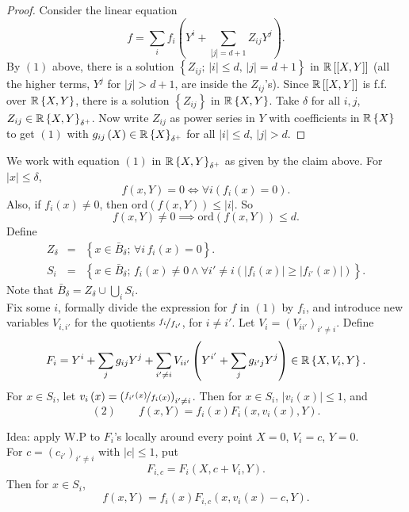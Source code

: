 \begin{proof}
Consider the linear equation 
\[
f=\sum_{i}f_{i}\left(Y^{i}+\sum_{\left|j\right|=d+1}Z_{ij}Y^{j}\right).
\]
By $\left(1\right)$ above, there is a solution $\left\{ Z_{ij};\,\left|i\right|\leq d,\,\left|j\right|=d+1\right\} $
in $\mathbb{R}\left[\left[X,Y\right]\right]$ (all the higher terms, $Y^{j}$
for $\left|j\right|>d+1$, are inside the $Z_{ij}$'s). Since $\mathbb{R}\left[\left[X,Y\right]\right]$
is f.f. over $\mathbb{R}\left\{ X,Y\right\} $, there is a solution $\left\{ Z_{ij}\right\} $
in $\mathbb{R}\left\{ X,Y\right\} $. Take $\delta$ for all $i,j$, $Z_{ij}\in\mathbb{R}\left\{ X,Y\right\} _{\delta^{+}}$.
Now write $Z_{ij}$ as power series in $Y$ with coefficients in $\mathbb{R}\left\{ X\right\} $
to get $\left(1\right)$ with $g_{ij}\left(X\right)\in\mathbb{R}\left\{ X\right\} _{\delta^{+}}$
for all $\left|i\right|\leq d$, $\left|j\right|>d$.
\end{proof}
We work with equation $\left(1\right)$ in $\mathbb{R}\left\{ X,Y\right\} _{\delta^{+}}$
as given by the claim above. For $\left|x\right|\leq\delta$,
\[
f\left(x,Y\right)=0\iff\forall i\left(f_{i}\left(x\right)=0\right).
\]
Also, if $f_{i}\left(x\right)\neq0$, then $\mathrm{ord}\left(f\left(x,Y\right)\right)\leq\left|i\right|$.
So
\[
f\left(x,Y\right)\neq0\implies\mathrm{ord}\left(f\left(x,Y\right)\right)\leq d.
\]
Define 
\begin{eqnarray*}
Z_{\delta} & = & \left\{ x\in\bar{B}_{\delta};\,\forall i\, f_{i}\left(x\right)=0\right\} .\\
S_{i} & = & \left\{ x\in\bar{B}_{\delta};\, f_{i}\left(x\right)\neq0\wedge\forall i'\neq i\left(\left|f_{i}\left(x\right)\right|\geq\left|f_{i'}\left(x\right)\right|\right)\right\} .
\end{eqnarray*}
Note that $\bar{B}_{\delta}=Z_{\delta}\cup\bigcup_{i}S_{i}$.\\
Fix some $i$, formally divide the expression for $f$ in $\left(1\right)$
by $f_{i}$, and introduce new variables $V_{i,i'}$ for the quotients
$\nicefrac{f_{i}}{f_{i'}}$, for $i\neq i'$. Let $V_{i}=\left(V_{ii'}\right)_{i'\neq i}$.
Define
\[
F_{i}=Y^{i}+\sum_{j}g_{ij}Y^{j}+\sum_{i'\neq i}V_{ii'}\left(Y^{i'}+\sum_{j}g_{i'j}Y^{j}\right)\in\mathbb{R}\left\{ X,V_{i},Y\right\} .
\]
For $x\in S_{i}$, let $v_{i}\left(x\right)=\left(\nicefrac{f_{i'}\left(x\right)}{f_{i}\left(x\right)}\right)_{i'\neq i}$.
Then for $x\in S_{i}$, $\left|v_{i}\left(x\right)\right|\leq1$,
and 
\[
\left(2\right)\qquad f\left(x,Y\right)=f_{i}\left(x\right)F_{i}\left(x,v_{i}\left(x\right),Y\right).
\]


Idea: apply W.P to $F_{i}$'s locally around every point $X=0$, $V_{i}=c$,
$Y=0$. \\
For $c=\left(c_{i'}\right)_{i'\neq i}$ with $\left|c\right|\leq1$,
put 
\[
F_{i,c}=F_{i}\left(X,c+V_{i},Y\right).
\]
Then for $x\in S_{i}$,
\[
f\left(x,Y\right)=f_{i}\left(x\right)F_{i,c}\left(x,v_{i}\left(x\right)-c,Y\right).
\]

